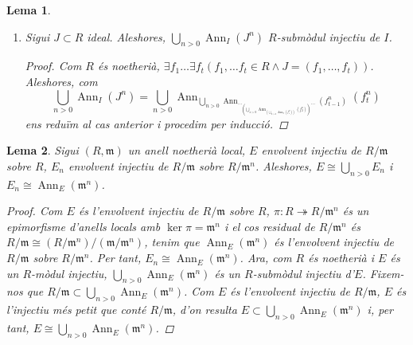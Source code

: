 \documentclass[compress]{article}
\newtheorem{lema}{Lema}
\theoremstyle{definition}
\DeclareMathOperator{\Ann}{Ann}
\begin{document}
\begin{lema}
\begin{enumerate}
\begin{proof}
\begin{equation*}
                \Ann_{R}(x')
                =\bigcup_{n>0}\Ann_{R}(f^{n}x')
            \end{equation*}
            Sigui $r\in Rx'\cap\bigcup_{n>0}\Ann_{R}(f^{n})$. Aleshores, $\exists n(n>0\land rf^{n}=0)$ i $\exists r'(r'\in R\land r'x'=r)$, d'on $r'f^{n}x'=rf^{n}=0$ i $r'\in\bigcup_{n>0}\Ann_{R}(f^{n}x')$. Com $\Ann_{R}(x')=\bigcup_{n>0}\Ann_{R}(f^{n}x')$, $r'\in\Ann_{R}(x')$, d'on $r=r'x'=0$. Per tant, $Rx'\cap\bigcup_{n>0}\Ann_{R}(f^{n})=\{0\}$, d'on deduïm que $\bigcup_{n>0}\Ann_{R}(f^{n})\subset E'$ no és una extensió essencial, contradicció. Per tant, $\bigcup_{n>0}\Ann_{R}(f^{n})=E'$ i, pel lema anterior, $\bigcup_{n>0}\Ann_{R}(f^{n})$ és $R$-submòdul injectiu de $I$.
        \end{proof}
        \item Sigui $J\subset R$ ideal. Aleshores, $\bigcup_{n>0}\Ann_{I}(J^{n})$ $R$-submòdul injectiu de $I$.
        \begin{proof}
            Com $R$ és noetherià, $\exists f_{1}\ldots\exists f_{t}(f_{1},\ldots f_{t}\in R\land J=(f_{1},\ldots,f_{t}))$. Aleshores, com
            \begin{equation*}
                \bigcup_{n>0}\Ann_{I}(J^{n})
                =\bigcup_{n>0}\Ann_{\bigcup_{n>0}\Ann_{\cdots_{(\bigcup_{n>0}\Ann_{(\bigcup_{n>0}\Ann_{I}(f_{1}^{n}))}(f_{2}^{n}))}\cdots}(f_{t-1}^{n})}(f_{t}^{n})
            \end{equation*}
            ens reduïm al cas anterior i procedim per inducció.
        \end{proof}
    \end{enumerate}
\end{lema}
\begin{lema}
    Sigui $(R,\mathfrak{m})$ un anell noetherià local, $E$ envolvent injectiu de $R/\mathfrak{m}$ sobre $R$, $E_{n}$ envolvent injectiu de $R/\mathfrak{m}$ sobre $R/\mathfrak{m}^{n}$. Aleshores, $E\cong\bigcup_{n>0}E_{n}$ i $E_{n}\cong\Ann_{E}(\mathfrak{m}^{n})$.
    \begin{proof}
        Com $E$ és l'envolvent injectiu de $R/\mathfrak{m}$ sobre $R$, $\pi:R\twoheadrightarrow R/\mathfrak{m}^{n}$ és un epimorfisme d'anells locals amb $\ker{\pi}=\mathfrak{m}^{n}$ i el cos residual de $R/\mathfrak{m}^{n}$ és $R/\mathfrak{m}\cong(R/\mathfrak{m}^{n})/(\mathfrak{m}/\mathfrak{m}^{n})$, tenim que $\Ann_{E}(\mathfrak{m}^{n})$ és l'envolvent injectiu de $R/\mathfrak{m}$ sobre $R/\mathfrak{m}^{n}$. Per tant, $E_{n}\cong\Ann_{E}(\mathfrak{m}^{n})$.\newline
        Ara, com $R$ és noetherià i $E$ és un $R$-mòdul injectiu, $\bigcup_{n>0}\Ann_{E}(\mathfrak{m}^{n})$ és un $R$-submòdul injectiu d'$E$. Fixem-nos que $R/\mathfrak{m}\subset\bigcup_{n>0}\Ann_{E}(\mathfrak{m}^{n})$. Com $E$ és l'envolvent injectiu de $R/\mathfrak{m}$, $E$ és l'injectiu més petit que conté $R/\mathfrak{m}$, d'on resulta $E\subset\bigcup_{n>0}\Ann_{E}(\mathfrak{m}^{n})$ i, per tant, $E\cong\bigcup_{n>0}\Ann_{E}(\mathfrak{m}^{n})$.
    \end{proof}
\end{lema}
\end{document}
